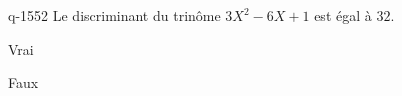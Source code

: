 \begin{truefalse}{q-1552}
Le discriminant du trinôme $3X^2-6X+1$ est égal à $32$.
\item Vrai
\item* Faux
\end{truefalse}

